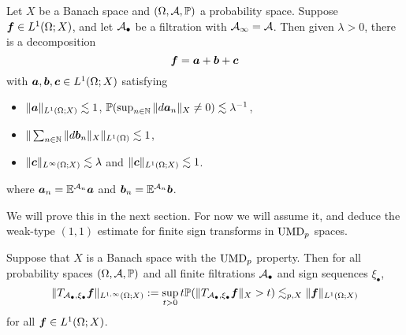 \begin{thm}\label{thm:gundy}
  Let $X$ be a Banach space and $(\Omega,\mathcal{A},\mathbb{P})$ a probability space.
  Suppose $\bm{f} \in L^1(\Omega;X)$, and let $\mathcal{A}_{\bullet}$ be a filtration with $\mathcal{A}_{\infty} = \mathcal{A}$.
  Then given $\lambda > 0$, there is a decomposition
  \begin{equation*}
    \bm{f} = \bm{a} + \bm{b} + \bm{c}
  \end{equation*}
  with $\bm{a}, \bm{b}, \bm{c} \in L^1(\Omega;X)$ satisfying
  \begin{itemize}
  \item $\|\bm{a}\|_{L^{1}(\Omega;X)} \lesssim 1$, $\mathbb{P}(\sup_{n \in \mathbb{N}} \|d\bm{a}_{n}\|_{X} \neq 0) \lesssim \lambda^{-1}$,
  \item $\| \sum_{n \in \mathbb{N}} \|d\bm{b}_{n}\|_{X} \|_{L^1(\Omega)} \lesssim 1$,
  \item $\| \bm{c} \|_{L^\infty(\Omega;X)} \lesssim \lambda$ and $\|\bm{c}\|_{L^1(\Omega;X)} \lesssim 1$.
  \end{itemize}
  where $\bm{a}_{n} = \mathbb{E}^{\mathcal{A}_{n}} \bm{a}$ and $\bm{b}_{n} = \mathbb{E}^{\mathcal{A}_{n}} \bm{b}$.
\end{thm}

We will prove this in the next section.
For now we will assume it, and deduce the weak-type $(1,1)$ estimate for finite sign transforms in $\mathrm{UMD}_{p}$ spaces.

\begin{prop}\label{prop:martingale-w11}
  Suppose that $X$ is a Banach space with the $\mathrm{UMD}_{p}$ property.
  Then for all probability spaces $(\Omega,\mathcal{A},\mathbb{P})$ and all finite filtrations $\mathcal{A}_{\bullet}$ and sign sequences $\xi_{\bullet}$,
  \begin{equation*}
    \|T_{\mathcal{A}_{\bullet}, \xi_{\bullet}} \bm{f}\|_{L^{1,\infty}(\Omega;X)} := \sup_{t > 0} t\mathbb{P}(\|T_{\mathcal{A}_{\bullet}, \xi_{\bullet}} \bm{f}\|_{X} > t) \lesssim_{p,X} \|\bm{f}\|_{L^1(\Omega;X)}
  \end{equation*}
  for all $\bm{f} \in L^1(\Omega;X)$.
\end{prop}

